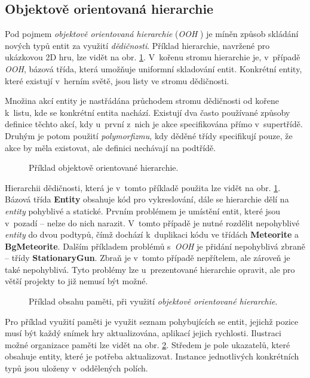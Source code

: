 \subsection{Objektově orientovaná hierarchie}

Pod pojmem \emph{objektově orientovaná hierarchie} (\emph{OOH} \cite{GameDesignPatterns}) je míněn způsob skládání nových typů entit za využití \emph{dědičnosti}. Příklad hierarchie, navržené pro ukázkovou 2D hru, lze vidět na obr. \ref{Fig:OOPHierarchy}. V~kořenu stromu hierarchie je, v~případě \emph{OOH}, bázová třída, která umožňuje uniformní skladování entit. Konkrétní entity, které existují v~herním světě, jsou listy ve stromu dědičnosti.

Množina akcí entity je nastřádána průchodem stromu dědičnosti od kořene k~listu, kde se konkrétní entita nachází. Existují dva často používané způsoby definice těchto akcí, kdy u~první z~nich je akce specifikována přímo v~supertřídě. Druhým je potom použití \emph{polymorfizmu}, kdy děděné třídy specifikují pouze, že akce by měla existovat, ale definici nechávají na podtřídě.

\begin{figure}[H]
	\caption{Příklad objektově orientované hierarchie.}
	\label{Fig:OOPHierarchy}
\end{figure}

Hierarchii dědičnosti, která je v~tomto příkladě použita lze vidět na obr. \ref{Fig:OOPHierarchy}. Bázová třída \textbf{Entity} obsahuje kód pro vykreslování, dále se hierarchie dělí na \emph{entity} pohyblivé a statické. Prvním problémem je umístění entit, které jsou v~pozadí -- nelze do nich narazit. V~tomto případě je nutné rozdělit nepohyblivé \emph{entity} do dvou podtypů, čímž dochází k~duplikaci kódu ve třídách \textbf{Meteorite} a \textbf{BgMeteorite}. Dalším příkladem problémů s~\emph{OOH} je přidání nepohyblivá zbraně -- třídy \textbf{StationaryGun}. Zbraň je v~tomto případě nepřítelem, ale zároveň je také nepohyblivá. Tyto problémy lze u~prezentované hierarchie opravit, ale pro větší projekty to již nemusí být možné. 

\begin{figure}[H]
	\centering
	\caption{Příklad obsahu paměti, při využití \emph{objektově orientované hierarchie}.}
	\label{Fig:OOPMemory}
\end{figure}

Pro příklad využití paměti je využit seznam pohybujících se entit, jejichž pozice musí být každý snímek hry aktualizována, aplikací jejich rychlosti. Ilustraci možné organizace paměti lze vidět na obr. \ref{Fig:OOPMemory}. Středem je pole ukazatelů, které obsahuje entity, které je potřeba aktualizovat. Instance jednotlivých konkrétních typů jsou uloženy v~oddělených polích.

